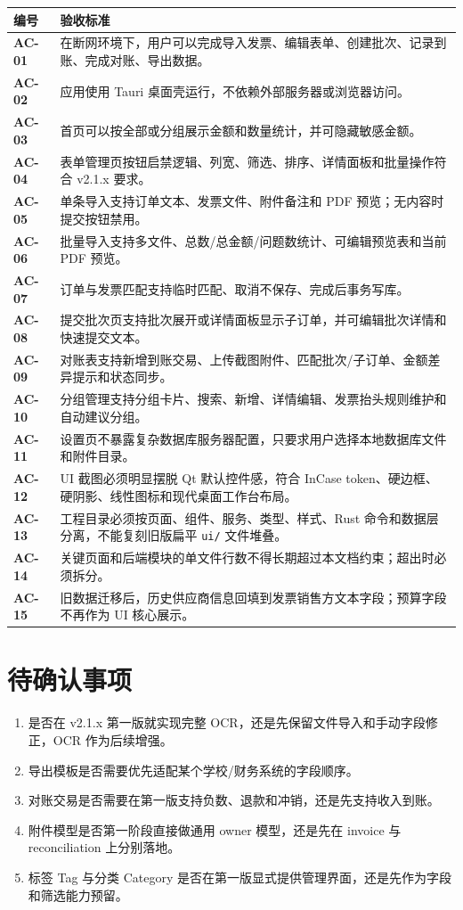 \documentclass[UTF8,zihao=-4]{ctexart}
\newcommand{\req}[1]{\textbf{\textcolor{ivicBrown}{#1}}}
\begin{document}
\begin{longtable}{p{3.0cm}p{11.4cm}}
\toprule
编号 & 验收标准 \\
\midrule
\req{AC-01} & 在断网环境下，用户可以完成导入发票、编辑表单、创建批次、记录到账、完成对账、导出数据。 \\
\req{AC-02} & 应用使用 Tauri 桌面壳运行，不依赖外部服务器或浏览器访问。 \\
\req{AC-03} & 首页可以按全部或分组展示金额和数量统计，并可隐藏敏感金额。 \\
\req{AC-04} & 表单管理页按钮启禁逻辑、列宽、筛选、排序、详情面板和批量操作符合 v2.1.x 要求。 \\
\req{AC-05} & 单条导入支持订单文本、发票文件、附件备注和 PDF 预览；无内容时提交按钮禁用。 \\
\req{AC-06} & 批量导入支持多文件、总数/总金额/问题数统计、可编辑预览表和当前 PDF 预览。 \\
\req{AC-07} & 订单与发票匹配支持临时匹配、取消不保存、完成后事务写库。 \\
\req{AC-08} & 提交批次页支持批次展开或详情面板显示子订单，并可编辑批次详情和快速提交文本。 \\
\req{AC-09} & 对账表支持新增到账交易、上传截图附件、匹配批次/子订单、金额差异提示和状态同步。 \\
\req{AC-10} & 分组管理支持分组卡片、搜索、新增、详情编辑、发票抬头规则维护和自动建议分组。 \\
\req{AC-11} & 设置页不暴露复杂数据库服务器配置，只要求用户选择本地数据库文件和附件目录。 \\
\req{AC-12} & UI 截图必须明显摆脱 Qt 默认控件感，符合 InCase token、硬边框、硬阴影、线性图标和现代桌面工作台布局。 \\
\req{AC-13} & 工程目录必须按页面、组件、服务、类型、样式、Rust 命令和数据层分离，不能复刻旧版扁平 \texttt{ui/} 文件堆叠。 \\
\req{AC-14} & 关键页面和后端模块的单文件行数不得长期超过本文档约束；超出时必须拆分。 \\
\req{AC-15} & 旧数据迁移后，历史供应商信息回填到发票销售方文本字段；预算字段不再作为 UI 核心展示。 \\
\bottomrule
\end{longtable}

\section{待确认事项}

\begin{enumerate}
  \item 是否在 v2.1.x 第一版就实现完整 OCR，还是先保留文件导入和手动字段修正，OCR 作为后续增强。
  \item 导出模板是否需要优先适配某个学校/财务系统的字段顺序。
  \item 对账交易是否需要在第一版支持负数、退款和冲销，还是先支持收入到账。
  \item 附件模型是否第一阶段直接做通用 owner 模型，还是先在 invoice 与 reconciliation 上分别落地。
  \item 标签 Tag 与分类 Category 是否在第一版显式提供管理界面，还是先作为字段和筛选能力预留。
\end{enumerate}
\end{document}
